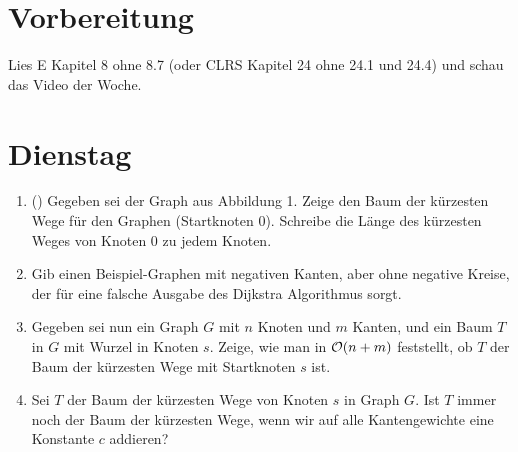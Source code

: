\documentclass{uebung_cs}
\begin{document}
\section*{Vorbereitung}
Lies E Kapitel 8 ohne 8.7 (oder CLRS Kapitel 24 ohne 24.1 und 24.4) und schau das Video der Woche.

\section*{Dienstag}
\begin{aufgabe}\label{tue-first}
	\begin{enumerate}
		\item (\warmup) Gegeben sei der Graph aus Abbildung 1.
		Zeige den Baum der kürzesten Wege für den Graphen (Startknoten 0).
		Schreibe die Länge des kürzesten Weges von Knoten 0 zu jedem Knoten.
		\item Gib einen Beispiel-Graphen mit negativen Kanten, aber ohne negative Kreise, der für eine falsche Ausgabe des Dijkstra Algorithmus sorgt.
		\item Gegeben sei nun ein Graph $G$ mit $n$ Knoten und $m$ Kanten, und ein Baum $T$ in $G$ mit Wurzel in Knoten $s$.
		Zeige, wie man in $\mathcal{O} (n+m)$ feststellt, ob $T$ der Baum der kürzesten Wege mit Startknoten $s$ ist.
		\item Sei $T$ der Baum der kürzesten Wege von Knoten $s$ in Graph $G$.
		Ist $T$ immer noch der Baum der kürzesten Wege, wenn wir auf alle Kantengewichte eine Konstante $c$ addieren?
	\end{enumerate}
\end{aufgabe}
\end{document}
